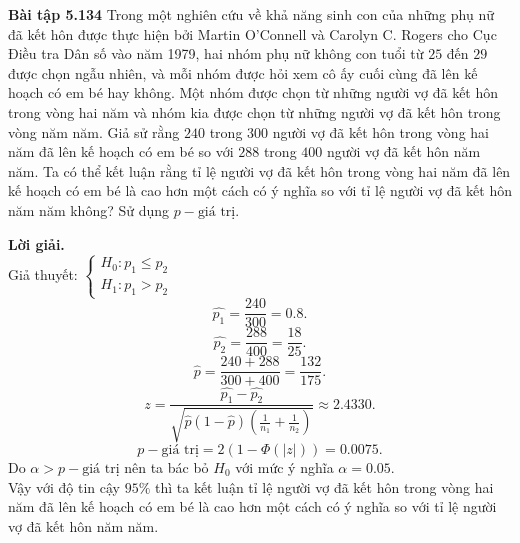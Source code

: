 \begin{mybox}
\textbf{Bài tập 5.134} Trong một nghiên cứu về khả năng sinh con của những phụ nữ đã kết hôn được thực hiện bởi Martin O'Connell và Carolyn C. Rogers cho Cục Điều tra Dân số vào năm 1979, hai nhóm phụ nữ không con tuổi từ $25$ đến $29$ được chọn ngẫu nhiên, và mỗi nhóm được hỏi xem cô ấy cuối cùng đã lên kế hoạch có em bé hay không. Một nhóm được chọn từ những người vợ đã kết hôn trong vòng hai năm và nhóm kia được chọn từ những người vợ đã kết hôn trong vòng năm năm. Giả sử rằng $240$ trong $300$ người vợ đã kết hôn trong vòng hai năm đã lên kế hoạch có em bé so với $288$ trong $400$ người vợ đã kết hôn năm năm. Ta có thể kết luận rằng tỉ lệ người vợ đã kết hôn trong vòng hai năm đã lên kế hoạch có em bé là cao hơn một cách có ý nghĩa so với tỉ lệ người vợ đã kết hôn năm năm không? Sử dụng $p-\text{giá trị}.$
\end{mybox}
\textbf{Lời giải.}\\
Giả thuyết: $\begin{cases}
H_0: p_1 \leqslant p_2\\
H_1: p_1 > p_2
\end{cases}$\\
$$\widehat{p_1} = \frac{240}{300} = 0.8.$$
$$\widehat{p_2} = \frac{288}{400} = \frac{18}{25}.$$
$$\widehat{p} = \frac{240 + 288}{300 + 400} = \frac{132}{175}.$$
$$z = \frac{{\widehat {{p_1}} - \widehat {{p_2}}}}{{\sqrt {\widehat p\left( {1 - \widehat p} \right)\left( {\frac{1}{{{n_1}}} + \frac{1}{{{n_2}}}} \right)} }} \approx 2.4330.$$
$$p-\text{giá trị} = 2 \left( {1 - \Phi \left( {\left| z \right|} \right)} \right) = 0.0075.$$
Do $\alpha > p-\text{giá trị}$ nên ta bác bỏ $H_0$ với mức ý nghĩa $\alpha = 0.05.$\\
Vậy với độ tin cậy $95\%$ thì ta kết luận tỉ lệ người vợ đã kết hôn trong vòng hai năm đã lên kế hoạch có em bé là cao hơn một cách có ý nghĩa so với tỉ lệ người vợ đã kết hôn năm năm.


